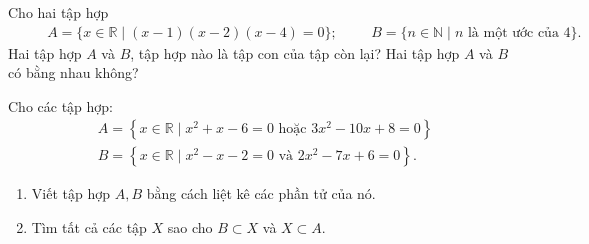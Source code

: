 \begin{bt}%
	Cho hai tập hợp
	\begin{align*}
	&&&A=\{x\in\mathbb{R}\mid (x-1)(x-2)(x-4)=0 \};
	&&&B=\{n\in\mathbb{N}\mid n \text{ là một ước của }4\}.
	\end{align*}
	Hai tập hợp $A$ và $B$, tập hợp nào là tập con của tập còn lại? Hai tập hợp $A$ và $B$ có bằng nhau không? 
\end{bt}
\begin{bt}%
	Cho các tập hợp:  
		\begin{align*}
		&A = \left\{ {x \in \mathbb{R}\mid{x^2} + x - 6 = 0} \right. \,\,\text{hoặc}\,\,\left. {3{x^2} - 10x + 8 = 0} \right\}\\
		&B = \left\{ {x \in \mathbb{R}\mid{x^2} - x - 2 = 0} \right.\,\,\text{và}\,\, \left. {2{x^2} - 7x + 6 = 0} \right\}.
		\end{align*}
	\begin{enumerate}
		\item Viết tập hợp $A, B$ bằng cách liệt kê các phần tử của nó.
		\item Tìm tất cả các tập $X$ sao cho $B \subset X$  và $X \subset A$. 
	\end{enumerate}
\end{bt}

